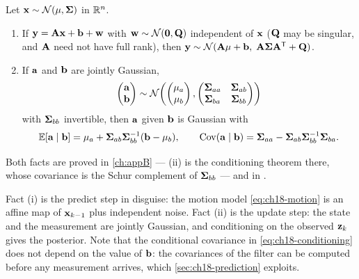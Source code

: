 \begin{lemma}
\label{thm:ch18-gaussian-facts}
Let $\mathbf{x}\sim\mathcal{N}(\mathbf{\mu},\mathbf{\Sigma})$ in $\mathbb{R}^n$.
\begin{enumerate}[label=(\roman*)]
  \item If $\mathbf{y}=\mathbf{A}\mathbf{x}+\mathbf{b}+\mathbf{w}$ with
  $\mathbf{w}\sim\mathcal{N}(\mathbf{0},\mathbf{Q})$ independent of $\mathbf{x}$ ($\mathbf{Q}$
  may be singular, and $\mathbf{A}$ need not have full rank), then
  $\mathbf{y}\sim\mathcal{N}(\mathbf{A}\mathbf{\mu}+\mathbf{b},\;\mathbf{A}\mathbf{\Sigma}\mathbf{A}^{\mathsf{T}}+\mathbf{Q})$.
  \item If $\mathbf{a}$ and $\mathbf{b}$ are jointly Gaussian,
  \[
    \begin{pmatrix}\mathbf{a}\\ \mathbf{b}\end{pmatrix}\sim
    \mathcal{N}\!\left(\begin{pmatrix}\mathbf{\mu}_a\\ \mathbf{\mu}_b\end{pmatrix},
    \begin{pmatrix}\mathbf{\Sigma}_{aa}&\mathbf{\Sigma}_{ab}\\ \mathbf{\Sigma}_{ba}&\mathbf{\Sigma}_{bb}\end{pmatrix}\right)
  \]
  with $\mathbf{\Sigma}_{bb}$ invertible, then $\mathbf{a}$ given $\mathbf{b}$ is
  Gaussian with
  \begin{equation}
    \mathbb{E}[\mathbf{a}\mid\mathbf{b}]=\mathbf{\mu}_a+\mathbf{\Sigma}_{ab}\mathbf{\Sigma}_{bb}^{-1}(\mathbf{b}-\mathbf{\mu}_b),\qquad
    \operatorname{Cov}(\mathbf{a}\mid\mathbf{b})=\mathbf{\Sigma}_{aa}-\mathbf{\Sigma}_{ab}\mathbf{\Sigma}_{bb}^{-1}\mathbf{\Sigma}_{ba}.
    \label{eq:ch18-conditioning}
  \end{equation}
\end{enumerate}
\end{lemma}
Both facts are proved in \cref{ch:appB} --- (ii) is the conditioning theorem
there, whose covariance is the Schur complement of $\mathbf{\Sigma}_{bb}$ --- and
in \textcite[ch.~3]{thrun2005probabilistic}.

Fact (i) is the predict step in disguise: the motion model
\cref{eq:ch18-motion} is an affine map of $\mathbf{x}_{k-1}$ plus independent
noise. Fact (ii) is the update step: the state and the measurement are
jointly Gaussian, and conditioning on the observed $\mathbf{z}_k$ gives the
posterior. Note that the conditional covariance in
\cref{eq:ch18-conditioning} does not depend on the value of $\mathbf{b}$: the
covariances of the filter can be computed before any measurement arrives,
which \cref{sec:ch18-prediction} exploits.

